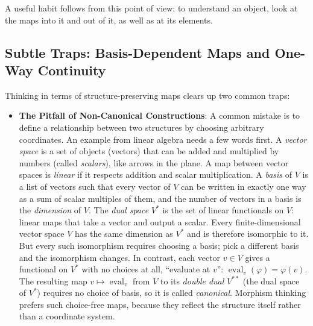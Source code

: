 A useful habit follows from this point of view: to understand an object, look at the maps into it and out of it, as well as at its elements.

\subsection{Subtle Traps: Basis-Dependent Maps and One-Way Continuity}

Thinking in terms of structure-preserving maps clears up two common traps:

\begin{itemize}
  \item \textbf{The Pitfall of Non-Canonical Constructions}: A common mistake is to define a relationship between two structures by choosing arbitrary coordinates. An example from linear algebra needs a few words first. A \emph{vector space} is a set of objects (vectors) that can be added and multiplied by numbers (called \emph{scalars}), like arrows in the plane. A map between vector spaces is \emph{linear} if it respects addition and scalar multiplication. A \emph{basis} of $V$ is a list of vectors such that every vector of $V$ can be written in exactly one way as a sum of scalar multiples of them, and the number of vectors in a basis is the \emph{dimension} of $V$. The \emph{dual space} $V^*$ is the set of linear functionals on $V$: linear maps that take a vector and output a scalar. Every finite-dimensional vector space $V$ has the same dimension as $V^*$ and is therefore isomorphic to it. But every such isomorphism requires choosing a basis; pick a different basis and the isomorphism changes. In contrast, each vector $v \in V$ gives a functional on $V^*$ with no choices at all, ``evaluate at $v$'': $\operatorname{eval}_v(\varphi) = \varphi(v)$. The resulting map $v \mapsto \operatorname{eval}_v$ from $V$ to its \emph{double dual} $V^{**}$ (the dual space of $V^*$) requires no choice of basis, so it is called \emph{canonical}. Morphism thinking prefers such choice-free maps, because they reflect the structure itself rather than a coordinate system.

\end{itemize}
